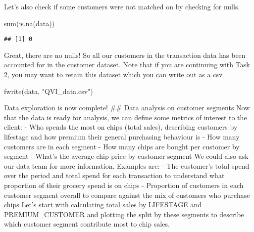 \documentclass[
]{article}
\newenvironment{Shaded}{\begin{snugshade}}{\end{snugshade}}
\newcommand{\FunctionTok}[1]{\textcolor[rgb]{0.00,0.00,0.00}{#1}}
\newcommand{\NormalTok}[1]{#1}
\newcommand{\StringTok}[1]{\textcolor[rgb]{0.31,0.60,0.02}{#1}}
\begin{document}
Let's also check if some customers were not matched on by checking for
nulls.

\begin{Shaded}
\begin{Highlighting}[]
\FunctionTok{sum}\NormalTok{(}\FunctionTok{is.na}\NormalTok{(data))}
\end{Highlighting}
\end{Shaded}

\begin{verbatim}
## [1] 0
\end{verbatim}

Great, there are no nulls! So all our customers in the transaction data
has been accounted for in the customer dataset. Note that if you are
continuing with Task 2, you may want to retain this dataset which you
can write out as a csv

\begin{Shaded}
\begin{Highlighting}[]
\FunctionTok{fwrite}\NormalTok{(data, }\StringTok{"QVI\_data.csv"}\NormalTok{)}
\end{Highlighting}
\end{Shaded}

Data exploration is now complete! \#\# Data analysis on customer
segments Now that the data is ready for analysis, we can define some
metrics of interest to the client: - Who spends the most on chips (total
sales), describing customers by lifestage and how premium their general
purchasing behaviour is - How many customers are in each segment - How
many chips are bought per customer by segment - What's the average chip
price by customer segment We could also ask our data team for more
information. Examples are: - The customer's total spend over the period
and total spend for each transaction to understand what proportion of
their grocery spend is on chips - Proportion of customers in each
customer segment overall to compare against the mix of customers who
purchase chips Let's start with calculating total sales by LIFESTAGE and
PREMIUM\_CUSTOMER and plotting the split by these segments to describe
which customer segment contribute most to chip sales.
\end{document}
